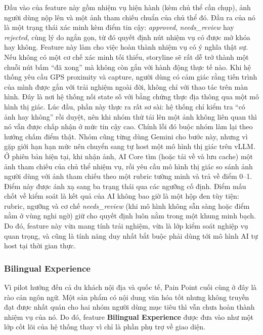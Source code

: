 Đầu vào của feature này gồm nhiệm vụ hiện hành (kèm chủ thể cần chụp),
ảnh người dùng nộp lên và một ảnh tham chiếu chuẩn của chủ thể đó. Đầu
ra của nó là một trạng thái xác minh kèm điểm tin cậy: \textit{approved},
\textit{needs\_review} hay \textit{rejected}, cùng lý do ngắn gọn, từ đó
quyết định nút nhiệm vụ có được mở khóa hay không. Feature này làm cho việc hoàn thành nhiệm vụ có ý nghĩa
thật sự. Nếu không có một cơ chế xác minh tối thiểu, storyline sẽ rất dễ
trở thành một chuỗi nút bấm ``đã xong'' mà không còn gắn với hành động
thực tế nào. Khi hệ thống yêu cầu GPS proximity và capture, người dùng
có cảm giác rằng tiến trình của mình được gắn với trải nghiệm ngoài đời,
không chỉ với thao tác trên màn hình. Đây là nơi hệ thống nối state số với bằng chứng
thực địa thông qua một mô hình thị giác. Lúc đầu, phần này thực
ra rất sơ sài: hệ thống chỉ kiểm tra ``có ảnh hay không'' rồi duyệt, nên
khi nhóm thử tải lên một ảnh không liên quan thì nó vẫn được chấp nhận ở
mức tin cậy cao. Chính lỗi đó buộc nhóm làm lại theo hướng chấm điểm thật.
Nhóm cũng từng dùng Gemini cho bước này, nhưng vì gặp giới hạn hạn mức
nên chuyển sang tự host một mô hình thị giác trên vLLM. Ở phiên bản hiện
tại, khi nhận ảnh, AI Core tìm (hoặc tải về và lưu cache) một ảnh tham
chiếu của chủ thể nhiệm vụ, rồi yêu cầu mô hình thị giác so sánh ảnh
người dùng với ảnh tham chiếu theo một rubric tường minh và trả về điểm 0--1. Điểm này được ánh xạ sang ba
trạng thái qua các ngưỡng cố định. Điểm mấu chốt về kiểm soát là kết quả
của AI không bao giờ là một hộp đen tùy tiện: rubric, ngưỡng và cơ chế
\textit{needs\_review} (khi mô hình không sẵn sàng hoặc điểm nằm ở vùng
nghi ngờ) giữ cho quyết định luôn nằm trong một khung minh bạch. Do đó,
feature này vừa mang tính trải nghiệm, vừa là lớp kiểm soát nghiệp vụ
quan trọng, và cũng là tính năng duy nhất bắt buộc phải dùng tới mô
hình AI tự host tại thời gian thực.

\subsubsection{Bilingual Experience}
\contrib

Vì pilot hướng đến cả du khách nội địa và quốc tế, Pain Point cuối cùng
ở đây là rào cản ngôn ngữ. Một sản phẩm có nội dung văn hóa tốt nhưng
không truyền đạt được nhất quán cho hai nhóm người dùng mục tiêu thì vẫn
chưa hoàn thành nhiệm vụ của nó. Do đó, feature \textbf{Bilingual
Experience} được đưa vào như một lớp cốt lõi của hệ thống thay vì chỉ là
phần phụ trợ về giao diện.

